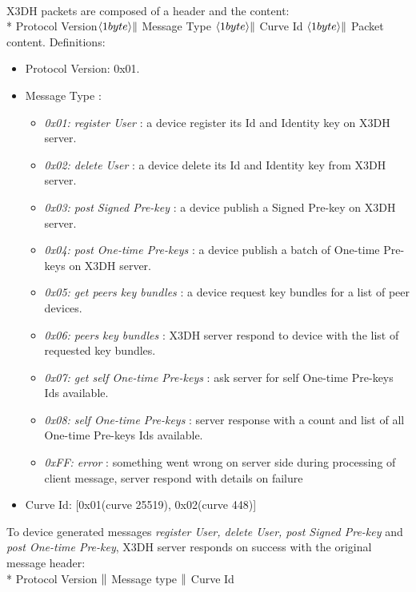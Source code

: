 \documentclass[a4paper,11pt]{article}
\begin{document}
    \paragraph*{}X3DH packets are composed of a header and the content:\\*
    Protocol Version$\langle 1byte\rangle \Arrowvert $ Message Type $\langle 1byte\rangle \Arrowvert $ Curve Id $\langle 1byte\rangle \Arrowvert $ Packet content.
    Definitions:
      \begin{itemize}
      \item Protocol Version: 0x01.
      \item Message Type :
        \begin{itemize}
          \item \textit{0x01: register User} : a device register its Id and Identity key on X3DH server.
          \item \textit{0x02: delete User} : a device delete its Id and Identity key from X3DH server.
          \item \textit{0x03: post Signed Pre-key} : a device publish a Signed Pre-key on X3DH server.
          \item \textit{0x04: post One-time Pre-keys} : a device publish a batch of One-time Pre-keys on X3DH server.
          \item \textit{0x05: get peers key bundles} : a device request key bundles for a list of peer devices.
          \item \textit{0x06: peers key bundles} : X3DH server respond to device with the list of requested key bundles.
          \item \textit{0x07: get self One-time Pre-keys} : ask server for self One-time Pre-keys Ids available.
          \item \textit{0x08: self One-time Pre-keys} : server response with a count and list of all One-time Pre-keys Ids available.          
          \item \textit{0xFF: error} : something went wrong on server side during processing of client message, server respond with details on failure
        \end{itemize}
      \item Curve Id: [0x01(curve 25519), 0x02(curve 448)]
      \end{itemize}
    
    To device generated messages \textit{register User, delete User, post Signed Pre-key} and \textit{post One-time Pre-key}, X3DH server responds on success with the original message header:\\*
    Protocol Version $\Arrowvert $ Message type $\Arrowvert $ Curve Id
\end{document}
